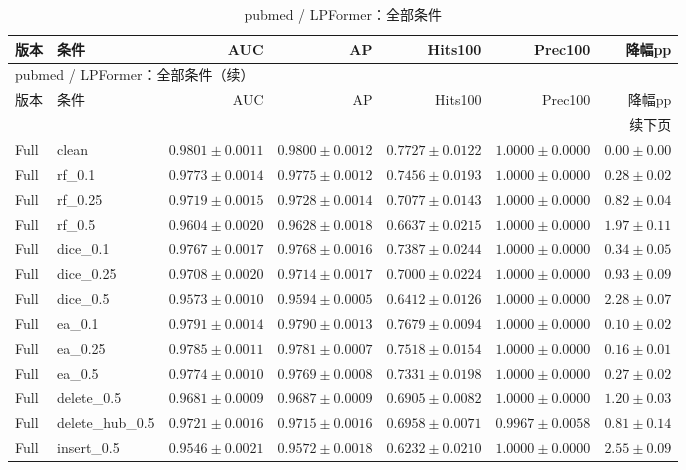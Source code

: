 \documentclass[UTF8,a4paper,11pt,fontset=fandol]{ctexart}
\begin{document}
{\footnotesize
\setlength{\tabcolsep}{3pt}
\begin{longtable}{llrrrrr}
\caption{pubmed / LPFormer：全部条件}\\
\toprule
版本 & 条件 & AUC & AP & Hits100 & Prec100 & 降幅pp \\
\midrule
\endfirsthead
\multicolumn{7}{l}{pubmed / LPFormer：全部条件（续）}\\
\toprule
版本 & 条件 & AUC & AP & Hits100 & Prec100 & 降幅pp \\
\midrule
\endhead
\midrule\multicolumn{7}{r}{续下页}\\
\endfoot
\bottomrule\endlastfoot
Full & clean & $0.9801\pm0.0011$ & $0.9800\pm0.0012$ & $0.7727\pm0.0122$ & $1.0000\pm0.0000$ & $0.00\pm0.00$ \\
Full & rf\_0.1 & $0.9773\pm0.0014$ & $0.9775\pm0.0012$ & $0.7456\pm0.0193$ & $1.0000\pm0.0000$ & $0.28\pm0.02$ \\
Full & rf\_0.25 & $0.9719\pm0.0015$ & $0.9728\pm0.0014$ & $0.7077\pm0.0143$ & $1.0000\pm0.0000$ & $0.82\pm0.04$ \\
Full & rf\_0.5 & $0.9604\pm0.0020$ & $0.9628\pm0.0018$ & $0.6637\pm0.0215$ & $1.0000\pm0.0000$ & $1.97\pm0.11$ \\
Full & dice\_0.1 & $0.9767\pm0.0017$ & $0.9768\pm0.0016$ & $0.7387\pm0.0244$ & $1.0000\pm0.0000$ & $0.34\pm0.05$ \\
Full & dice\_0.25 & $0.9708\pm0.0020$ & $0.9714\pm0.0017$ & $0.7000\pm0.0224$ & $1.0000\pm0.0000$ & $0.93\pm0.09$ \\
Full & dice\_0.5 & $0.9573\pm0.0010$ & $0.9594\pm0.0005$ & $0.6412\pm0.0126$ & $1.0000\pm0.0000$ & $2.28\pm0.07$ \\
Full & ea\_0.1 & $0.9791\pm0.0014$ & $0.9790\pm0.0013$ & $0.7679\pm0.0094$ & $1.0000\pm0.0000$ & $0.10\pm0.02$ \\
Full & ea\_0.25 & $0.9785\pm0.0011$ & $0.9781\pm0.0007$ & $0.7518\pm0.0154$ & $1.0000\pm0.0000$ & $0.16\pm0.01$ \\
Full & ea\_0.5 & $0.9774\pm0.0010$ & $0.9769\pm0.0008$ & $0.7331\pm0.0198$ & $1.0000\pm0.0000$ & $0.27\pm0.02$ \\
Full & delete\_0.5 & $0.9681\pm0.0009$ & $0.9687\pm0.0009$ & $0.6905\pm0.0082$ & $1.0000\pm0.0000$ & $1.20\pm0.03$ \\
Full & delete\_hub\_0.5 & $0.9721\pm0.0016$ & $0.9715\pm0.0016$ & $0.6958\pm0.0071$ & $0.9967\pm0.0058$ & $0.81\pm0.14$ \\
Full & insert\_0.5 & $0.9546\pm0.0021$ & $0.9572\pm0.0018$ & $0.6232\pm0.0210$ & $1.0000\pm0.0000$ & $2.55\pm0.09$ \\

\end{longtable}}
\end{document}
